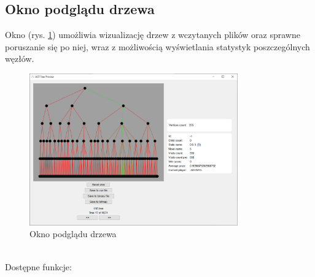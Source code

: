 \documentclass{article}
\begin{document}
\subsection{Okno podglądu drzewa}
Okno (rys. \ref{rys:treewindow}) umożliwia wizualizację drzew z wczytanych plików oraz sprawne poruszanie się po niej, wraz z możliwością wyświetlania statystyk poszczególnych węzłów.
\begin{figure}[h]
	\centering
	\includegraphics[width=0.8\textwidth]{tree-window}
	\caption{Okno podglądu drzewa}
	\label{rys:treewindow}
\end{figure}\\
Dostępne funkcje:\\
\end{document}
